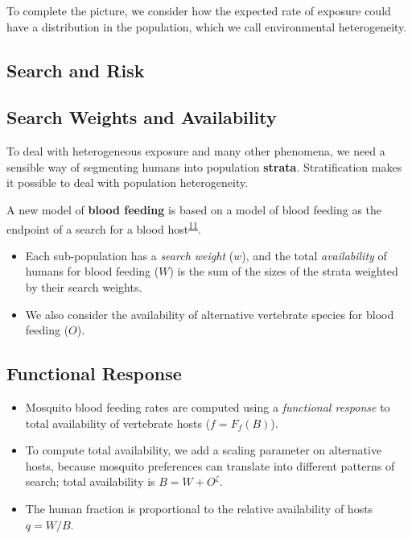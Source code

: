 \documentclass[
]{book}
\begin{document}
To complete the picture, we consider how the expected rate of exposure could have a distribution in the population, which we call environmental heterogeneity.

\hypertarget{search-and-risk}{%
\subsection{Search and Risk}\label{search-and-risk}}

\hypertarget{search-weights-and-availability}{%
\subsection{Search Weights and Availability}\label{search-weights-and-availability}}

To deal with heterogeneous exposure and many other phenomena, we need a sensible way of segmenting humans into population \textbf{strata}. Stratification makes it possible to deal with population heterogeneity.

A new model of \textbf{blood feeding} is based on a model of blood feeding as the endpoint of a search for a blood host\textsuperscript{\protect\hyperlink{ref-WuSL2023SpatialDynamics}{11}}.

\begin{itemize}
\item
  Each sub-population has a \emph{search weight} (\(w\)), and the total \emph{availability} of humans for blood feeding (\(W\)) is the sum of the sizes of the strata weighted by their search weights.
\item
  We also consider the availability of alternative vertebrate species for blood feeding (\(O\)).
\end{itemize}

\hypertarget{functional-response}{%
\subsection{Functional Response}\label{functional-response}}

\begin{itemize}
\item
  Mosquito blood feeding rates are computed using a \emph{functional response} to total availability of vertebrate hosts (\(f = F_f(B)\)).
\item
  To compute total availability, we add a scaling parameter on alternative hosts, because mosquito preferences can translate into different patterns of search; total availability is \(B=W + O^\zeta\).
\item
  The human fraction is proportional to the relative availability of hosts \(q = W/B\).
\end{itemize}
\end{document}
